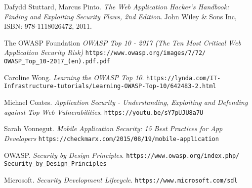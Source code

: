 \documentclass[a4paper]{article}
\begin{document}
\newpage

\begin{thebibliography}{9}


		Dafydd Stuttard, Marcus Pinto.
		\textit{The Web Application Hacker's Handbook: Finding and
		Exploiting Security Flaws, 2nd Edition}.
		John Wiley \& Sons Inc, ISBN: 978-1118026472, 2011.

		The OWASP Foundation
		\textit{OWASP Top 10 - 2017 (The Ten Most Critical Web
		Application Security Risk)}
		\texttt{https://www.owasp.org/images/7/72/
		OWASP\_Top\_10-2017\_(en).pdf.pdf}

		Caroline Wong.
		\textit{Learning the OWASP Top 10}.
		\texttt{https://lynda.com/IT-\allowbreak{}
		Infrastructure-tutorials/Learning-OWASP-Top-10/642483-2.html}
		
		Michael Coates.
		\textit{Application Security - Understanding, Exploiting and
		Defending against Top Web Vulnerabilities}.
		\texttt{https://youtu.be/sY7pUJU8a7U}

		Sarah Vonnegut.
		\textit{Mobile Application Security: 15 Best Practices for App
		Developers}
		\texttt{https://checkmarx.com/2015/08/19/mobile-application}

		OWASP.
		\textit{Security by Design Principles}.
		\texttt{https://www.owasp.org/index.php/\allowbreak{}
		Security\_by\_Design\_Principles}

		Microsoft.
		\textit{Security Development Lifecycle}.
		\texttt{https://www.microsoft.com/sdl}

\end{thebibliography}
\end{document}
